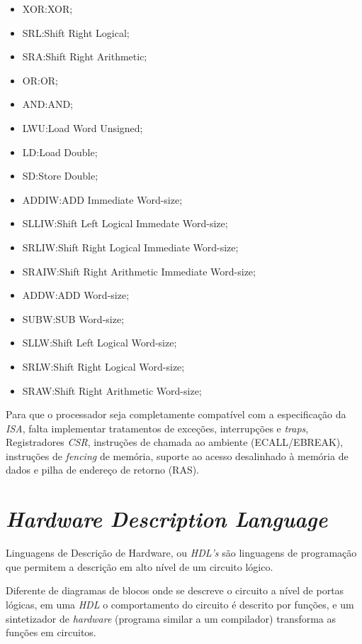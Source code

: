\begin{itemize}[leftmargin=20mm]
    \item {XOR:\@ XOR;}
    \item {SRL:\@ Shift Right Logical;}
    \item {SRA:\@ Shift Right Arithmetic;}
    \item {OR:\@ OR;}
    \item {AND:\@ AND;}
    \item {LWU:\@ Load Word Unsigned;}
    \item {LD:\@ Load Double;}
    \item {SD:\@ Store Double;}
    \item {ADDIW:\@ ADD Immediate Word-size;}
    \item {SLLIW:\@ Shift Left Logical Immedate Word-size;}
    \item {SRLIW:\@ Shift Right Logical Immediate Word-size;}
    \item {SRAIW:\@ Shift Right Arithmetic Immediate Word-size;}
    \item {ADDW:\@ ADD Word-size;}
    \item {SUBW:\@ SUB Word-size;}
    \item {SLLW:\@ Shift Left Logical Word-size;}
    \item {SRLW:\@ Shift Right Logical Word-size;}
    \item {SRAW:\@ Shift Right Arithmetic Word-size;}
\end{itemize}

{
    Para que o processador seja completamente compatível com a
    especificação da \textit{ISA}, falta implementar tratamentos de
    exceções, interrupções e \textit{traps}, Registradores \textit{CSR},
    instruções de chamada ao ambiente (ECALL/EBREAK), instruções de
    \textit{fencing} de memória, suporte ao acesso desalinhado à memória
    de dados e pilha de endereço de retorno (RAS).
}

\section{\textit{Hardware Description Language}}
{
    Linguagens de Descrição de Hardware, ou \textit{HDL's} são linguagens de
    programação que permitem a descrição em alto nível de um circuito lógico.
}

{
    Diferente de diagramas de blocos onde se descreve o circuito a nível de
    portas lógicas, em uma \textit{HDL} o comportamento do circuito é descrito
    por funções, e um sintetizador de \textit{hardware} (programa similar a um 
    compilador) transforma as funções em circuitos.
}


